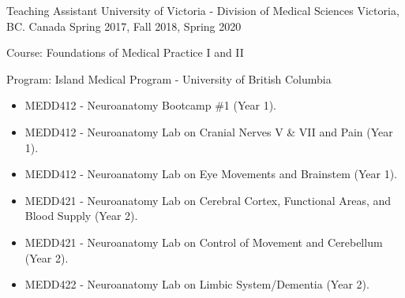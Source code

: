 

\begin{cventries}

  \cventry
    {Teaching Assistant} %
    {University of Victoria - Division of Medical Sciences} %
    {Victoria, BC. Canada} %
    {Spring 2017, Fall 2018, Spring 2020} %
    {
      \begin{cvitems} %
        \item {Course: Foundations of Medical Practice I and II}
        \item {Program: Island Medical Program - University of British Columbia}
        \begin{itemize}
          \begin{itemize}
            \item MEDD412 - Neuroanatomy Bootcamp \#1 (Year 1).
            \item MEDD412 - Neuroanatomy Lab on Cranial Nerves V \& VII and Pain (Year 1).
            \item MEDD412 - Neuroanatomy Lab on Eye Movements and Brainstem (Year 1).
            \item MEDD421 - Neuroanatomy Lab on Cerebral Cortex, Functional Areas, and Blood Supply (Year 2).
            \item MEDD421 - Neuroanatomy Lab on Control of Movement and Cerebellum (Year 2).
            \item MEDD422 - Neuroanatomy Lab on Limbic System/Dementia (Year 2).
            \end{itemize}
        \end{itemize}
      \end{cvitems}
      }
 
\end{cventries}
